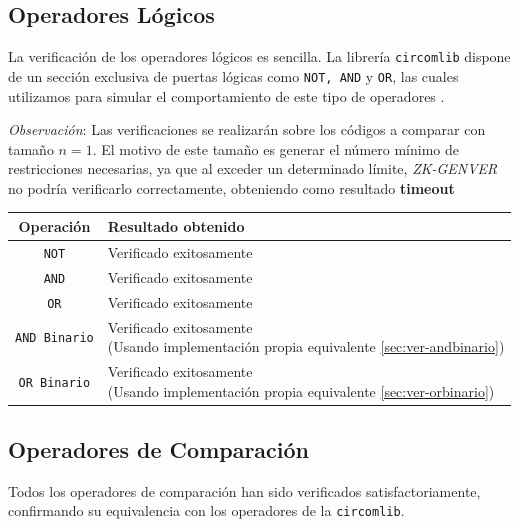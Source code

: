 \documentclass[a4paper,12pt]{report}
\begin{document}
	
	\subsection{Operadores Lógicos}
	\noindent La verificación de los operadores lógicos es sencilla. La librería \texttt{circomlib} dispone de un sección exclusiva de puertas lógicas como \texttt{NOT, AND} y \texttt{OR}, las cuales utilizamos para simular el comportamiento de este tipo de operadores \cite{iden3_gates_circom}.
	
	\vspace{0.2cm}
	\noindent \textit{Observación}: Las verificaciones se realizarán sobre los códigos a comparar con tamaño $n=1$. El motivo de este tamaño es generar el número mínimo de restricciones necesarias, ya que al exceder un determinado límite, \textit{ZK-GENVER} no podría verificarlo correctamente, obteniendo como resultado \textbf{timeout}
	
	\vspace{0.5cm}
	\begingroup %
	\renewcommand{\arraystretch}{2} 
	\begin{longtable}{|c|>{\centering\arraybackslash}m{10cm}|}
		\hline
		\textbf{Operación} & \textbf{Resultado obtenido} \\
		\hline
		
		\texttt{NOT} & Verificado exitosamente \checkmark \\
		\hline
		
		\texttt{AND} & 
		Verificado exitosamente \checkmark \\
		\hline
		
		\texttt{OR} & 
		Verificado exitosamente \checkmark \\
		\hline
		
		\texttt{AND Binario} & \makecell[c]{Verificado exitosamente \checkmark \\ \footnotesize (Usando implementación propia equivalente \ref{sec:ver-andbinario})} \\
		\hline
		
		\texttt{OR Binario} & \makecell[c]{Verificado exitosamente \checkmark \\ \footnotesize (Usando implementación propia equivalente \ref{sec:ver-orbinario})} \\
		\hline
	\end{longtable}
	\endgroup
	
	
	\subsection{Operadores de Comparación}
	\vspace{0.2cm}
	\noindent Todos los operadores de comparación han sido verificados satisfactoriamente, confirmando su equivalencia con los operadores 
	de la \texttt{circomlib}.
	
\end{document}
